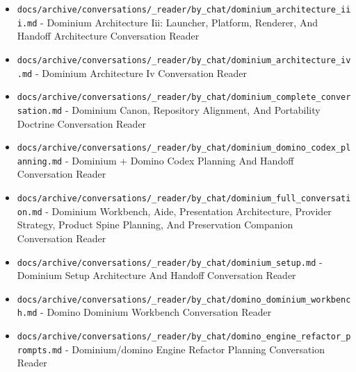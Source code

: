 \documentclass[10.5pt,a4paper,openany]{book}
\begin{document}
\begin{itemize}
\item \texttt{docs/\allowbreak{}archive/\allowbreak{}conversations/\allowbreak{}\_\allowbreak{}reader/\allowbreak{}by\_\allowbreak{}chat/\allowbreak{}dominium\_\allowbreak{}architecture\_\allowbreak{}iii.\allowbreak{}md} -\allowbreak{} Dominium Architecture Iii: Launcher, Platform, Renderer, And Handoff Architecture Conversation Reader
\item \texttt{docs/\allowbreak{}archive/\allowbreak{}conversations/\allowbreak{}\_\allowbreak{}reader/\allowbreak{}by\_\allowbreak{}chat/\allowbreak{}dominium\_\allowbreak{}architecture\_\allowbreak{}iv.\allowbreak{}md} -\allowbreak{} Dominium Architecture Iv Conversation Reader
\item \texttt{docs/\allowbreak{}archive/\allowbreak{}conversations/\allowbreak{}\_\allowbreak{}reader/\allowbreak{}by\_\allowbreak{}chat/\allowbreak{}dominium\_\allowbreak{}complete\_\allowbreak{}conversation.\allowbreak{}md} -\allowbreak{} Dominium Canon, Repository Alignment, And Portability Doctrine Conversation Reader
\item \texttt{docs/\allowbreak{}archive/\allowbreak{}conversations/\allowbreak{}\_\allowbreak{}reader/\allowbreak{}by\_\allowbreak{}chat/\allowbreak{}dominium\_\allowbreak{}domino\_\allowbreak{}codex\_\allowbreak{}planning.\allowbreak{}md} -\allowbreak{} Dominium + Domino Codex Planning And Handoff Conversation Reader
\item \texttt{docs/\allowbreak{}archive/\allowbreak{}conversations/\allowbreak{}\_\allowbreak{}reader/\allowbreak{}by\_\allowbreak{}chat/\allowbreak{}dominium\_\allowbreak{}full\_\allowbreak{}conversation.\allowbreak{}md} -\allowbreak{} Dominium Workbench, Aide, Presentation Architecture, Provider Strategy, Product Spine Planning, And Preservation Companion Conversation Reader
\item \texttt{docs/\allowbreak{}archive/\allowbreak{}conversations/\allowbreak{}\_\allowbreak{}reader/\allowbreak{}by\_\allowbreak{}chat/\allowbreak{}dominium\_\allowbreak{}setup.\allowbreak{}md} -\allowbreak{} Dominium Setup Architecture And Handoff Conversation Reader
\item \texttt{docs/\allowbreak{}archive/\allowbreak{}conversations/\allowbreak{}\_\allowbreak{}reader/\allowbreak{}by\_\allowbreak{}chat/\allowbreak{}domino\_\allowbreak{}dominium\_\allowbreak{}workbench.\allowbreak{}md} -\allowbreak{} Domino Dominium Workbench Conversation Reader
\item \texttt{docs/\allowbreak{}archive/\allowbreak{}conversations/\allowbreak{}\_\allowbreak{}reader/\allowbreak{}by\_\allowbreak{}chat/\allowbreak{}domino\_\allowbreak{}engine\_\allowbreak{}refactor\_\allowbreak{}prompts.\allowbreak{}md} -\allowbreak{} Dominium/\allowbreak{}domino Engine Refactor Planning Conversation Reader

\end{itemize}
\end{document}
